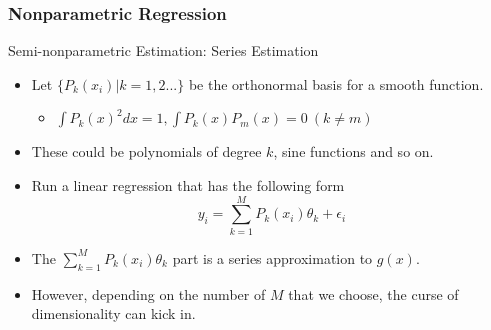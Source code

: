 \documentclass{beamer}
\begin{document}
\begin{frame}
\frametitle{Nonparametric Regression}
Semi-nonparametric Estimation: Series Estimation
\begin{itemize}
\item Let $\{P_k(x_i)|k=1,2...\}$ be the orthonormal basis for a smooth function.
\begin{itemize}
\item $\int P_k(x)^2 dx=1, \int P_k(x) P_m(x)=0 \ (k\neq m)$
\end{itemize}
\item These could be polynomials of degree $k$, sine functions and so on.
\item Run a linear regression that has the following form
\[
y_i = \sum_{k=1}^MP_k(x_i)\theta_k+\epsilon_i
\]
\item The $\sum_{k=1}^MP_k(x_i)\theta_k$ part is a series approximation to $g(x)$. 
\item However, depending on the number of $M$ that we choose, the curse of dimensionality can kick in. 
\end{itemize}
\end{frame}
\end{document}
